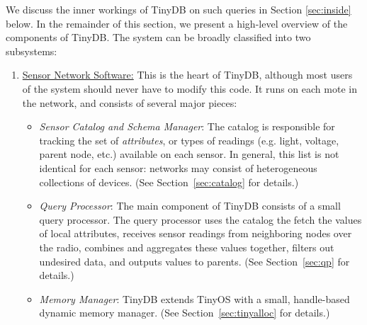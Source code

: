 \documentclass[11pt]{article}
\begin{document}
We discuss the inner workings of TinyDB on such queries in
Section \ref{sec:inside} below.  In the remainder of this section, we
present a high-level overview of the components of TinyDB.  The system
can be broadly classified into two subsystems:

\begin{enumerate}
\item \underline{Sensor Network Software:}  This is the heart of TinyDB, although most users of
the system should never have to modify this code.  It runs on each
mote in the network, and consists of several major pieces:
\begin{itemize}
\item {\it Sensor Catalog and Schema Manager}:  The catalog is responsible for tracking the
set of {\it attributes}, or types of readings (e.g. light, voltage, parent node, etc.) available
on each sensor.  In general, this list is not identical for each sensor:  networks may consist
of heterogeneous collections of devices.  (See
Section~\ref{sec:catalog} for details.)

\item {\it Query Processor}:  The main component of TinyDB consists of a small query processor.  
The query processor uses the catalog the fetch the values of local attributes, receives sensor
readings from neighboring nodes over the radio, combines and aggregates these values together,
filters out undesired data, and outputs values to
parents.  (See Section~\ref{sec:qp} for details.)

\item {\it Memory Manager}:  TinyDB extends TinyOS with a small, handle-based
  dynamic memory manager.  (See Section~\ref{sec:tinyalloc} for details.)


\end{itemize}
\end{enumerate}
\end{document}
